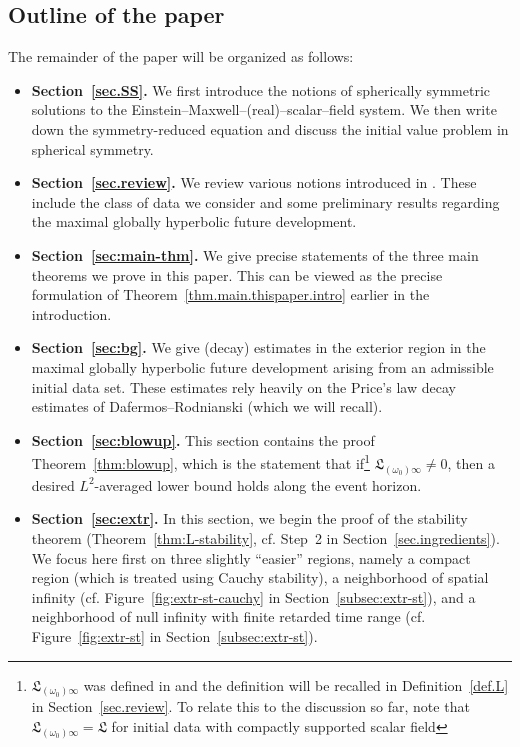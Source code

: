 \documentclass[10pt, reqno]{amsart}
\theoremstyle{definition}
\theoremstyle{remark}
\theoremstyle{conjecture}
\numberwithin{equation}{section}
\newcommand{\0}{\emptyset}
\newcommand{\omg}{\omega}
\begin{document}
\subsection{Outline of the paper}\label{outline}
The remainder of the paper will be organized as follows:
\begin{itemize}
\item {\bf Section~\ref{sec.SS}.} We first introduce the notions of spherically symmetric solutions to the Einstein--Maxwell--(real)--scalar--field system. We then write down the symmetry-reduced equation and discuss the initial value problem in spherical symmetry.
\item {\bf Section~\ref{sec.review}.} We review various notions introduced in \cite{LO.interior}. These include the class of data we consider and some preliminary results regarding the maximal globally hyperbolic future development.
\item {\bf Section~\ref{sec:main-thm}.} We give precise statements of the three main theorems we prove in this paper. This can be viewed as the precise formulation of Theorem~\ref{thm.main.thispaper.intro} earlier in the introduction.
\item {\bf Section~\ref{sec:bg}.} We give (decay) estimates in the exterior region in the maximal globally hyperbolic future development arising from an admissible initial data set. These estimates rely heavily on the Price's law decay estimates of Dafermos--Rodnianski \cite{DRPL} (which we will recall).
\item {\bf Section~\ref{sec:blowup}.} This section contains the proof Theorem~\ref{thm:blowup}, which is the statement that if\footnote{$\mathfrak L_{(\omg_0)\infty}$ was defined in \cite{LO.interior} and the definition will be recalled in Definition~\ref{def.L} in Section~\ref{sec.review}. To relate this to the discussion so far, note that $\mathfrak L_{(\omg_0)\infty}=\mathfrak L$ for initial data with compactly supported scalar field} $\mathfrak L_{(\omg_0)\infty}\neq 0$, then a desired $L^2$-averaged lower bound holds along the event horizon.
\item {\bf Section~\ref{sec:extr}.} In this section, we begin the proof of the stability theorem (Theorem~\ref{thm:L-stability}, cf. Step~2 in Section~\ref{sec.ingredients}). We focus here first on three slightly ``easier'' regions, namely a compact region (which is treated using Cauchy stability), a neighborhood of spatial infinity (cf. Figure~\ref{fig:extr-st-cauchy} in Section~\ref{subsec:extr-st}), and a neighborhood of null infinity with finite retarded time range (cf. Figure~\ref{fig:extr-st} in Section~\ref{subsec:extr-st}).

\end{itemize}
\end{document}
